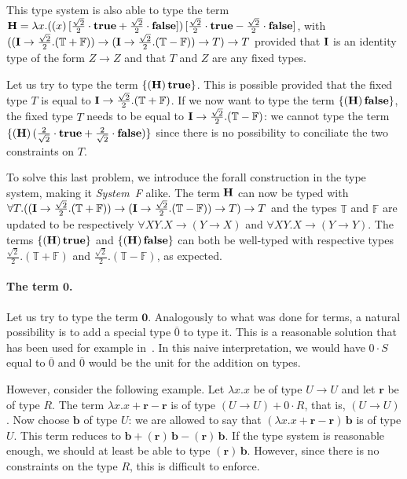 \documentclass[colorlinks=true,linkcolor=black,urlcolor=black,citecolor=blue,submission,copyright,creativecommons]{eptcs}
\newcommand{\canon}[1]{[#1]}
\newcommand{\cocanon}[1]{\{#1\}}
\newcommand{\True}{\mathbb{T}}
\newcommand{\False}{\mathbb{F}}
\newcommand{\true}{{\bf true}}
\newcommand{\false}{{\bf false}}
\newcommand{\ve}[1]{\mathrm{\textbf{#1}}}
\begin{document}
This type system is also able to type the term ${\bf H}=\lambda
x.((x)\,\canon{\frac{\sqrt2}2\cdot\true+\frac{\sqrt2}2\cdot\false})\,
\canon{\frac{\sqrt2}2\cdot\true-\frac{\sqrt2}2\cdot\false}$, with
$(({\bf I}\to\frac{\sqrt 2}2.(\True+\False)) \to ({\bf
  I}\to\frac{\sqrt 2}2.(\True-\False)) \to T)\to T$
provided that ${\bf I}$ is an identity type of the form $Z\to Z$ and that
$T$ and $Z$ are any fixed types.

Let us try to type the term $\cocanon{({\bf H})\,\true}$. 
This is possible provided
that the fixed type $T$ is equal to ${\bf I}\to\frac{\sqrt
  2}2.(\True+\False)$. If we now want to type the term $\cocanon{({\bf
  H})\,\false}$, the fixed type $T$ needs to be equal to ${\bf
  I}\to\frac{\sqrt 2}2.(\True-\False)$: we cannot type the term $\cocanon{({\bf
  H})\,(\frac{2}{\sqrt2}\cdot\true + \frac2{\sqrt2}\cdot\false)}$ since
there is no possibility to conciliate the two constraints on $T$.

To solve this last problem, we introduce the forall construction in
the type system, making it {\em System~F} alike.  The term ${\bf H}$ can now
be typed with $\forall T.(({\bf I}\to\frac{\sqrt 2}2.(\True+\False))
\to ({\bf I}\to\frac{\sqrt 2}2.(\True-\False)) \to T)\to T$ and the
types $\True$ and $\False$ are updated to be respectively $\forall
XY.X\to(Y\to X)$ and $\forall XY.X\to(Y\to Y)$.  The terms
$\cocanon{({\bf H})\,\true}$ and $\cocanon{({\bf H})\,\false}$ can
both be well-typed with respective types $\frac{\sqrt
  2}2.(\True+\False)$ and $\frac{\sqrt 2}2.(\True-\False)$, as
expected.

\paragraph{The term $\ve0$.}
Let us try to type the term $\ve{0}$. Analogously to what was done for
terms, a natural possibility is to add a special type $\overline{0}$
to type it. This is a reasonable solution that has been used for
example in~\cite{ArrighiDiazcaroQPL09}. In this naive interpretation,
we would have $0\cdot S$ equal to $\overline 0$ and $\overline 0$
would be the unit for the addition on types.

However, consider the following example. Let $\lambda x.x$ be of type $U\to U$
and let $\ve r$ be of type $R$. The term $\lambda x.x + \ve r - \ve r$
is of type $(U\to U) + 0\cdot R$, that is, $(U\to U)$. Now choose $\ve
b$ of type $U$: we are allowed to say that $(\lambda x.x + \ve r - \ve
r)\,\ve b$ is of type $U$. This term reduces to $\ve b + (\ve r)\,\ve
b - (\ve r)\,\ve b$. If the type system is reasonable enough, we
should at least be able to type $(\ve r)\,\ve b$. However, since there is no
constraints on the type $R$, this is difficult to enforce.
\end{document}
